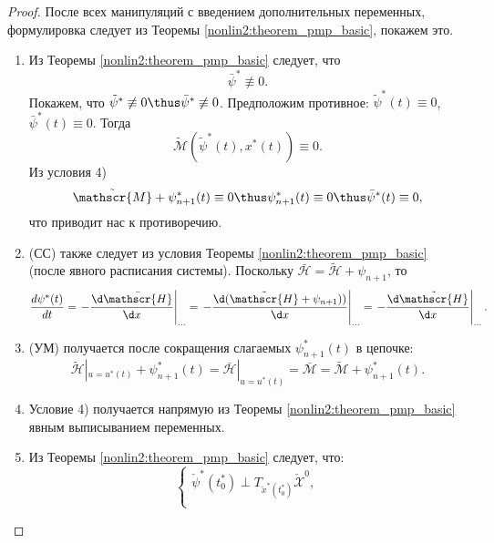\begin{proof}
    После всех манипуляций с введением дополнительных переменных, формулировка следует из Теоремы \ref{nonlin2:theorem_pmp_basic}, покажем это.
    \begin{enumerate}
        \item Из Теоремы \ref{nonlin2:theorem_pmp_basic} следует, что
        $$
        \bar{\psi}^* \not\equiv 0.
        $$
        Покажем, что $\tilde{\psi}^* \not \equiv 0 \thus \bar{\psi}^* \not \equiv 0$. Предположим противное: ${\tilde{\psi}^*(t) \equiv 0}$, ${\bar{\psi}^*(t)} \equiv 0$. Тогда
        $$
            \tilde{\mathscr{M}}(\tilde{\psi}^*(t), x^*(t)) \equiv 0.
        $$
        Из условия 4)
        $$
            \tilde{\mathscr{M}} + \psi^*_{n+1}(t) \equiv 0 \thus \psi^*_{n+1}(t) \equiv 0 \thus \bar{\psi}^*(t) \equiv 0,
        $$
        что приводит нас к противоречию.
        \item (СС) также следует из условия Теоремы \ref{nonlin2:theorem_pmp_basic} (после явного расписания системы). Поскольку $\bar{\mathscr{H}} = \tilde{\mathscr{H}} + \psi_{n+1}$, то
        $$
            \dfrac{d \psi^*(t)}{dt} = \left. -\frac{\d \bar{\mathscr{H}}}{\d x} \right|_{\ldots} = \left. -\frac{\d (\tilde{\mathscr{H}} + \psi_{n+1}))}{\d x} \right|_{\ldots} = \left. -\frac{\d \tilde{\mathscr{H}}}{\d x} \right|_{\ldots}.
        $$
        \item (УМ) получается после сокращения слагаемых $\psi_{n+1}^*(t)$ в цепочке:
        $$
            \tilde{\mathscr{H}}|_{u = u^*(t)} + \psi_{n+1}^*(t) = \bar{\mathscr{H}}|_{u = u^*(t)} = \bar{\mathscr{M}} = \tilde{\mathscr{M}} + \psi_{n+1}^*(t).
        $$
        \item Условие 4) получается напрямую из Теоремы \ref{nonlin2:theorem_pmp_basic} явным выписыванием переменных.
        \item Из Теоремы \ref{nonlin2:theorem_pmp_basic} следует, что:
        $$
            \left\{
                \begin{matrix}
                    \check{\psi}^*(t_0^*) \perp T_{\check{x}^*(t_0^*)}\check{\mathscr{X}}^0, \\

\end{matrix}$$
\end{enumerate}
\end{proof}
